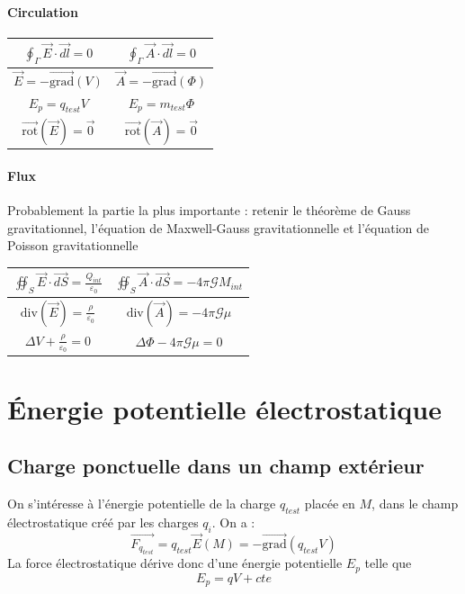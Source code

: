 \documentclass[french]{book}
\theoremstyle{plain}
\theoremstyle{definition}
\theoremstyle{remark}
\newcommand{\grad}{\overrightarrow{\text{grad}}}
\newcommand{\rot}{\overrightarrow{\text{rot}}}
\renewcommand{\div}{\text{div}}
\begin{document}
\paragraph{Circulation}
\begin{center}
	\begin{tabular}{|c|c|}
		\hline
		$\displaystyle\oint_\Gamma\overrightarrow{E}\cdot\overrightarrow{dl}=0$&$\displaystyle\oint_\Gamma\overrightarrow{A}\cdot\overrightarrow{dl}=0$ \\[4mm]
		\hline
		$\overrightarrow{E}=-\grad(V)$&$\overrightarrow{A}=-\grad(\Phi)$ \\[4mm]
		\hline
		$E_p=q_{test}V$&$E_p=m_{test}\Phi$ \\[4mm]
		\hline
		$\rot(\overrightarrow{E})=\overrightarrow{0}$&$\rot(\overrightarrow{A})=\overrightarrow{0}$ \\[4mm]
		\hline
	\end{tabular}
\end{center}
\paragraph{Flux} Probablement la partie la plus importante : retenir le théorème de Gauss gravitationnel, l'équation de Maxwell-Gauss gravitationnelle et l'équation de Poisson gravitationnelle
\begin{center}
	\begin{tabular}{|c|c|}
		\hline
		$\displaystyle\oiint_S\overrightarrow{E}\cdot\overrightarrow{dS}=\frac{Q_{int}}{\varepsilon_0}$&$\displaystyle\oiint_S\overrightarrow{A}\cdot\overrightarrow{dS}=-4\pi \mathcal{G}M_{int}$\\[4mm]
		\hline
		$\div(\overrightarrow{E})=\displaystyle\frac{\rho}{\varepsilon_0}$&$\div(\overrightarrow{A})=-4\pi \mathcal{G}\mu$\\[4mm]
		\hline
		$\Delta V+\displaystyle\frac{\rho}{\varepsilon_0}=0$&$\displaystyle\Delta \Phi-4\pi \mathcal{G}\mu=0$\\
		\hline
	\end{tabular}
\end{center}
\section{Énergie potentielle électrostatique}
\subsection{Charge ponctuelle dans un champ extérieur}
On s'intéresse à l'énergie potentielle de la charge $q_{test}$ placée en $M$, dans le champ électrostatique créé par les charges $q_i$. On a :$$\overrightarrow{F_{q_{test}}}=q_{test}\overrightarrow{E}(M)=-\grad(q_{test}V)$$ La force électrostatique dérive donc d'une énergie potentielle $E_p$ telle que $$E_p=qV+cte$$
\end{document}

